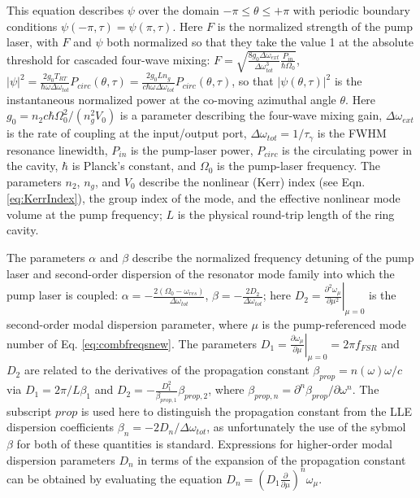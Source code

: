 This equation describes $\psi$ over the domain $-\pi\leq\theta\leq+\pi$ with periodic boundary conditions $\psi(-\pi,\tau)=\psi(\pi,\tau)$. Here $F$ is the normalized strength of the pump laser, with $F$ and $\psi$ both normalized so that they  take the value 1 at the absolute threshold for cascaded four-wave mixing: $F=\sqrt{\frac{8 g_0\Delta\omega_{ext}}{\Delta\omega_{tot}^3}\frac{P_{in}}{\hbar \Omega_0}}$, $|\psi|^2=\frac{2g_0T_{RT}}{\hbar\omega\Delta\omega_{tot}}P_{circ}(\theta,\tau)=\frac{2g_0Ln_g}{c\hbar\omega\Delta\omega_{tot}}P_{circ}(\theta,\tau)$, so that $|\psi(\theta,\tau)|^2$ is the instantaneous normalized power at the co-moving azimuthal angle $\theta$. Here $g_0=n_2 c \hbar \Omega_0^2/(n_g^2 V_0)$ is a parameter describing the four-wave mixing gain, $\Delta\omega_{ext}$ is the rate of coupling at the input/output port, $\Delta\omega_{tot}=1/\tau_\gamma$ is the FWHM resonance linewidth, $P_{in}$ is the pump-laser power, $P_{circ}$ is the circulating power in the cavity, $\hbar$ is Planck's constant, and $\Omega_0$ is the pump-laser frequency. The parameters $n_2$, $n_g$, and $V_0$ describe the nonlinear (Kerr) index (see Eqn. \ref{eq:KerrIndex}), the group index of the mode, and the effective nonlinear mode volume at the pump frequency; $L$ is the physical round-trip length of the ring cavity. 

The parameters $\alpha$ and $\beta$ describe the normalized frequency detuning of the pump laser and second-order dispersion of the resonator mode family into which the pump laser is coupled: $\alpha=-\frac{2(\Omega_0-\omega_{res})}{\Delta\omega_{tot}}$, $\beta=-\frac{2 D_2}{\Delta\omega_{tot}}$; here $D_2=\left.\frac{\partial^2\omega_\mu}{\partial \mu^2}\right|_{\mu=0}$ is the second-order modal dispersion parameter, where $\mu$ is the pump-referenced mode number of Eq. \ref{eq:combfreqsnew}. The parameters $D_1=\left.\frac{\partial\omega_\mu}{\partial\mu}\right|_{\mu=0}=2\pi f_{FSR}$ and $D_2$ are related to the derivatives of the propagation constant $\beta_{prop}=n(\omega)\omega/c$ via $D_1=2\pi/L\beta_1$ and $D_2=-\frac{D_1^2}{\beta_{prop,1}}\beta_{prop,2}$, where $\beta_{prop,n}=\partial^n\beta_{prop}/\partial\omega^n$. The subscript $prop$ is used here to distinguish the propagation constant from the LLE dispersion coefficients $\beta_n=-2D_n/\Delta\omega_{tot}$, as unfortunately the use of the sybmol $\beta$ for both of these quantities is standard. Expressions for higher-order modal dispersion parameters $D_n$ in terms of the expansion of the propagation constant can be obtained by evaluating the equation $D_n=(D_1\frac{\partial}{\partial \mu})^n \omega_\mu$.

